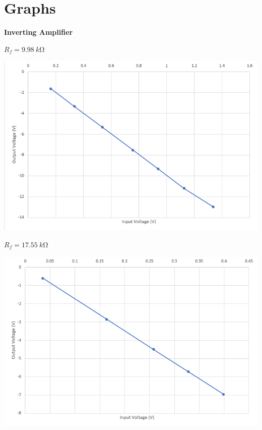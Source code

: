 \section{Graphs}
\begin{center}
    \textbf{Inverting Amplifier}
\end{center}
\begin{center}
    $R_f = \SI{9.98}{k\ohm}$
\end{center}
\begin{center}
    \includegraphics[scale = 0.7]{OPAMP Config/invampf1.png}
\end{center}
\begin{center}
    $R_f = \SI{17.55}{k\ohm}$
\end{center}
\begin{center}
    \includegraphics[scale = 0.7]{OPAMP Config/invampf2.png}
\end{center}
